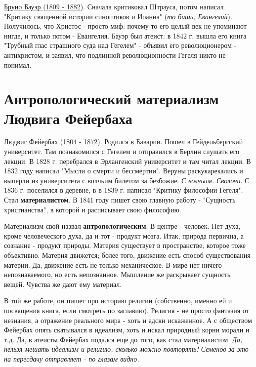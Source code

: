 \underline{Бруно Бауэр (1809 - 1882)}. Сначала критиковал Штрауса, потом написал "Критику священной истории синоптиков и Иоанна" (\textit{то бишь, Евангелий}). Получилось, что Христос - просто миф: почему-то его целый век не упоминают нигде, и только потом - Евангелия. Бауэр был атеист: в 1842 г. вышла его книга "Трубный глас страшного суда над Гегелем" - объявил его революционером - антихристом, и заявил, что подлинной революционности Гегеля никто не понимал.
 
\section{Антропологический материализм Людвига Фейербаха}
\underline{Людвиг Фейербах (1804 - 1872)}. Родился в Баварии. Пошел в Гейдельбергский университет. Там познакомился с Гегелем и отправился в Берлин слушать его лекции. В 1828 г. перебрался в Эрлангенский университет и там читал лекции. В 1832 году написал "Мысли о смерти и бессмертии". Веруны раскукарекались и выперли из университета с волчьим билетом за безбожие. \textit{С волчьим. Сволочи}. С 1836 г. поселился в деревне, в в 1839 г. написал "Критику философии Гегеля". Стал \textbf{материалистом}. В 1841 году пишет свою главную работу - "Сущность христианства", в которой и расписывает свою философию. 

Материализм свой назвал \textbf{антропологическим}. В центре - человек. Нет духа, кроме человеческого духа, да и тот - продукт мозга. Итак, природа первична, а сознание - продукт природы. Материя существует в пространстве, которое тоже объективно. Материя движется; более того, движение есть способ существования материи. Да, движение есть не только механическое. В мире нет ничего непознаваемого, но есть непознанное. Мышление же раскрывает сущность вещей. Чувства же дают ему материал.

В той же работе, он пишет про историю религии (собственно, именно ей и посвящения книга, если смотреть по заглавию). Религия - не просто фантазия от незнания, а отражение реального мира - хоть и адски искаженное. А с обществом Фейербах опять скатывался в идеализм, хоть и искал природный корни морали и т.д. Да, в атеисты Фейербах подался еще до того, как стал материалистом. \textit{Да, нельзя мешать идеализм и религию, сколько можно повторять! Семенов за это на пересдачу отправляет - по глазам видно.} 

